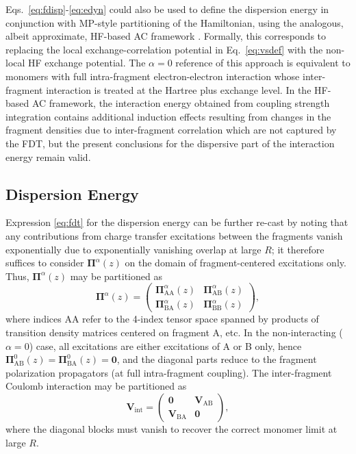 \documentclass[journal=jctcce,manuscript=article]{achemso}
\begin{document}
Eqs.~\eqref{eq:fdisp}-\eqref{eq:edyn} could
also be
used to define the dispersion energy in conjunction with
MP-style partitioning of the Hamiltonian, using the
analogous, albeit approximate, HF-based AC
framework \cite{Eshuis12TheorChemAcc131p1084}. Formally, this
corresponds to replacing the local exchange-correlation potential in
Eq.~\eqref{eq:vsdef} with the non-local HF exchange potential. The
$\alpha=0$ reference of this
approach is equivalent to monomers with full intra-fragment
electron-electron interaction whose inter-fragment interaction is
treated at the Hartree plus exchange level. In the HF-based AC framework, the
interaction energy obtained from coupling strength integration contains
additional induction effects resulting from changes in the fragment densities
due to inter-fragment correlation which are not captured by the
FDT, but the present conclusions for the
dispersive part of the interaction energy remain valid.

\subsection{Dispersion Energy}

Expression \eqref{eq:fdt} for the dispersion energy can be further
re-cast by noting that any contributions from
charge transfer excitations between the fragments vanish exponentially
due to exponentially vanishing overlap at large $R$; it therefore
suffices to consider $\boldsymbol{\Pi}^\alpha(z)$ on the domain of
fragment-centered excitations only.
Thus,
$\boldsymbol{\Pi}^\alpha(z)$ may be partitioned as 
\begin{equation}
    \boldsymbol{\Pi}^\alpha(z) = 
    \begin{pmatrix}
    \boldsymbol{\Pi}^\alpha_\text{AA}(z) & \boldsymbol{\Pi}^\alpha_\text{AB}(z) \\
    \boldsymbol{\Pi}^\alpha_\text{BA}(z) & \boldsymbol{\Pi}^\alpha_\text{BB}(z) 
    \end{pmatrix},
  \end{equation}
where indices AA refer to the 4-index tensor space spanned by products
of transition density matrices centered on fragment A, etc. In the
non-interacting ($\alpha=0$) case, all excitations are either
excitations of A or B only, hence
$\boldsymbol{\Pi}^0_\text{AB}(z) =
\boldsymbol{\Pi}^0_\text{BA}(z) = \mathbf{0}$, and the diagonal
parts reduce to the fragment polarization propagators (at full
intra-fragment coupling).
The inter-fragment Coulomb interaction may be partitioned as
\begin{equation}
  \mathbf{V}_{\text{int}} = \begin{pmatrix}
    \mathbf{0} & \mathbf{V}_{\text{AB}}\\
     \mathbf{V}_{\text{BA}} & \mathbf{0} \end{pmatrix},
\end{equation}
where the diagonal blocks must vanish to recover the correct monomer
limit at large $R$.
\end{document}
